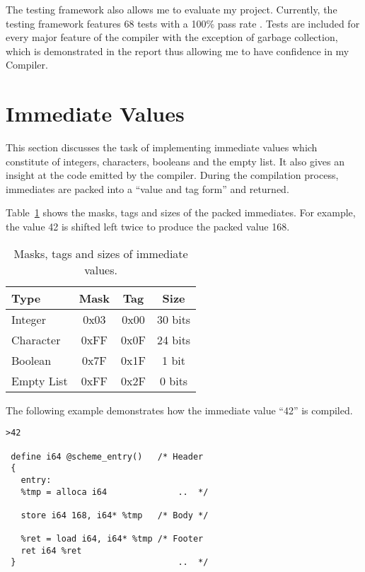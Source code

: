 \documentclass{article}
\begin{document}
The testing framework also allows me to evaluate my project. Currently, the testing framework features 68 tests with a 100\% pass rate . Tests are included for every major feature of the compiler with the exception of garbage collection, which is demonstrated in the report thus allowing me to have confidence in my Compiler.

\section{Immediate Values}

This section discusses the task of implementing immediate values which constitute of integers, characters, booleans and the empty list. It also gives an insight at the code emitted by the compiler. During the compilation process, immediates are packed into a ``value and tag form'' and returned.

Table~\ref{tab:immediates} shows the masks, tags and sizes of the packed immediates. For example, the value 42 is shifted left twice to produce the packed value 168.

\begin{table}[ht]
  \centering
\begin{tabular}{ l c c c }
  \toprule
  Type & Mask & Tag & Size \\ \hline
  \midrule
  Integer & 0x03 & 0x00 & 30 bits  \\
  Character & 0xFF & 0x0F & 24 bits  \\
  Boolean & 0x7F & 0x1F & 1 bit \\
  Empty List & 0xFF & 0x2F & 0 bits \\
  \bottomrule
\end{tabular}
\caption{Masks, tags and sizes of immediate values.} \label{tab:immediates}
\end{table}

The following example demonstrates how the immediate value ``42'' is compiled. 

\begin{verbatim}
>42

 define i64 @scheme_entry()   /* Header 
 {                            
   entry:
   %tmp = alloca i64              ..  */

   store i64 168, i64* %tmp   /* Body */ 

   %ret = load i64, i64* %tmp /* Footer
   ret i64 %ret                   
 }                                ..  */
\end{verbatim}
\end{document}
